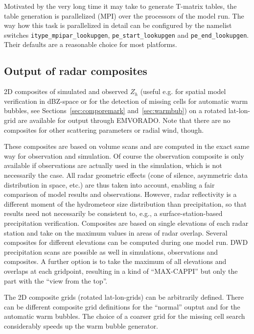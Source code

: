 \documentclass[10pt,a4paper,twoside,headinclude,footinclude,parskip=half]{scrartcl}
\newcommand{\myaktuellesection}{sec:intro}%
\newcommand{\labelsec}[1]{\label{#1}\renewcommand{\myaktuellesection}{#1}}%
\newcommand{\labelsec}[1]{\label{#1}}%
\newcommand{\srcform}[1]{\mbox{\texttt{#1}}\xspace}%
\begin{document}
Motivated by the very long time it may take to generate T-matrix tables, the table generation is parallelized (MPI) over the processors of the model run.
The way how this task is parallelized in detail can be configured by the namelist switches \srcform{itype_mpipar_lookupgen}, \srcform{pe_start_lookupgen} and \srcform{pe_end_lookupgen}.
Their defaults are a reasonable choice for most platforms.


\subsection{Output of radar composites}

\labelsec{sec:intro:compo}

2D composites of simulated and observed $Z_h$ (useful e.g. for spatial model verification in dBZ-space or for the detection of missing cells for automatic warm bubbles, see Sections~\ref{sec:comporemark} and~\ref{sec:warmbub}) on a rotated lat-lon-grid
are available for output through EMVORADO. Note that there are no composites for other scattering parameters or radial wind, though.

These composites are based on volume scans and are computed
in the exact same way for observation and simulation. Of course the observation composite is only
available if observations are actually used in the simulation, which is not necessarily the case.
All radar geometric effects (cone of silence,
asymmetric data distribution in space, etc.) are thus taken into account, enabling a fair
comparison of model results and observations. However, radar reflectivity is a different moment
of the hydrometeor size distribution than precipitation, so that results need not necessarily be
consistent to, e.g., a surface-station-based precipitation verification.
Composites are based on single elevations of each
radar station and take on the maximum values in areas of radar overlap. Several composites for
different elevations can be computed during one model run. DWD precipitation scans are
possible as well in simulations, observations and composites. A further option is to take the
maximum of all elevations and overlaps at each gridpoint, resulting in a kind of ``MAX-CAPPI'' but only
the part with the ``view from the top''.

The 2D composite grids (rotated lat-lon-grids) can be arbitrarily defined. There can be different composite grid definitions for the ``normal'' ouptut
and for the automatic warm bubbles. The choice of a coarser grid for the missing cell search considerably speeds up the warm bubble generator.
\end{document}
